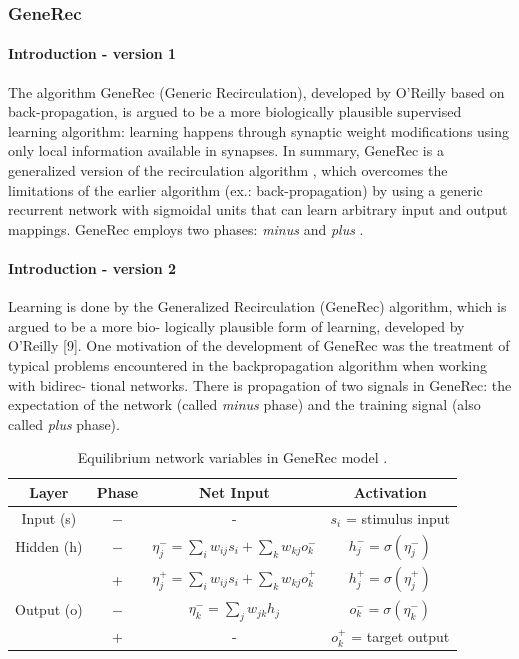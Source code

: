 \subsubsection{GeneRec}

\paragraph{Introduction - version 1} 
The algorithm GeneRec (Generic Recirculation), developed by O’Reilly \citet{o1996bio} based on back-propagation, is argued to be a more biologically plausible supervised learning algorithm: learning happens through synaptic weight modifications using only local information available in synapses. In summary, GeneRec is a generalized version of the recirculation algorithm \citet{hinton1988learning}, which overcomes the limitations of the earlier algorithm (ex.: back-propagation) by using a generic recurrent network with sigmoidal units that can learn arbitrary input and output mappings. GeneRec employs two phases: \emph{minus} and \emph{plus} \citet{da2011advances}. 

\paragraph{Introduction - version 2} 
Learning is done by the Generalized Recirculation
(GeneRec) algorithm, which is argued to be a more bio-
logically plausible form of learning, developed by O’Reilly
[9]. One motivation of the development of GeneRec was
the treatment of typical problems encountered in the
backpropagation algorithm when working with bidirec-
tional networks. There is propagation of two signals in
GeneRec: the expectation of the network (called \emph{minus}
phase) and the training signal (also called \emph{plus} phase).
\citet{schneider2009application} 

\begin{table}
  \centering
  \caption{Equilibrium network variables in GeneRec model \citet{farkas2013bal}.}
  \label{tab:gr-states}
  \begin{tabular}{|cccc|}
    \hline
    Layer & Phase & Net Input & Activation\\
    \hline
    Input (s)    & $-$ & - & $s_i$ = stimulus input\\
    \hline
    Hidden (h)   & $-$ & \hspace{0.3cm}$\eta^{-}_j = \sum_i w_{ij}s_i + \sum_k w_{kj}o^{-}_k$\hspace{0.3cm} &
    $h^{-}_j = \sigma(\eta^{-}_j)$\hspace{0.3cm}\\
          &  +  & $\eta^{+}_j = \sum_{i}w_{ij}s_i + \sum_k w_{kj}o^{+}_k$ & $h^{+}_{j} = \sigma(\eta^{+}_j)$ \\
    \hline
    Output (o) & $-$ & $\eta^{-}_k = \sum_j w_{jk}h_j$ & $o^{-}_k = \sigma(\eta^{-}_k)$\\
           &  +  & - & $o^{+}_k$ = target output \\
    \hline
  \end{tabular}
\end{table}

